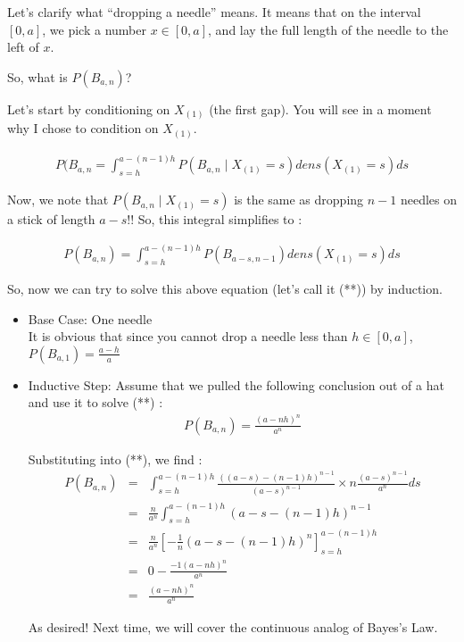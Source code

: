 Let's clarify what ``dropping a needle'' means.  It means that on the interval $[0, a]$, we pick a number $x \in [0, a]$, and lay the full length of the needle to the left of $x$.

So, what is $P(B_{a,n})$?

Let's start by conditioning on $X_{(1)}$ (the first gap).  You will see in a moment why I chose to condition on $X_{(1)}$.

\begin{eqnarray*}
P(B_{a,n} = \int_{s=h}^{a-(n-1)h}{P(B_{a,n} \mid X_{(1)}=s) dens(X_{(1)}=s)ds}
\end{eqnarray*}

Now, we note that $P(B_{a,n} \mid X_{(1)}=s)$ is the same as dropping $n-1$ needles on a stick of length $a-s$!!  So, this integral simplifies to :

\begin{eqnarray*}
P(B_{a,n}) = \int_{s=h}^{a-(n-1)h}{P(B_{a-s,n-1}) dens(X_{(1)}=s)ds}
\end{eqnarray*}

So, now we can try to solve this above equation (let's call it (**)) by induction.

\begin{itemize}
\item Base Case: One needle\\
It is obvious that since you cannot drop a needle less than $h \in [0, a]$, $P(B_{a,1}) = \frac{a-h}{a}$
\item Inductive Step: Assume that we pulled the following conclusion out of a hat and use it to solve (**) : 
\begin{eqnarray*}
P(B_{a,n}) = \frac{(a-nh)^n}{a^n}
\end{eqnarray*}

Substituting into (**), we find :
\begin{eqnarray*}
P(B_{a,n}) &=& \int_{s=h}^{a-(n-1)h}{\frac{((a-s)-(n-1)h)^{n-1}}{(a-s)^{n-1}} \times n\frac{(a-s)^{n-1}}{a^n}ds}\\
           &=& \frac{n}{a^n} \int_{s=h}^{a-(n-1)h}{(a-s-(n-1)h)^{n-1}}\\
           &=& \frac{n}{a^n} \left[ -\frac {1}{n} (a-s-(n-1)h)^n \right]_{s=h}^{a-(n-1)h}\\
           &=& 0 - \frac{-1(a-nh)^n}{a^n}\\
           &=& \frac{(a-nh)^n}{a^n}
\end{eqnarray*}

As desired!  Next time, we will cover the continuous analog of Bayes's Law.
\end{itemize}

